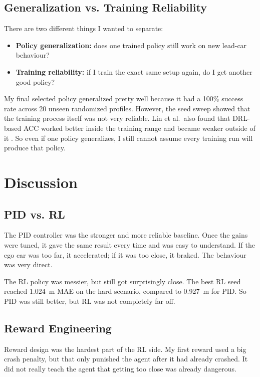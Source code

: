 \documentclass{article}
\begin{document}
\subsection*{Generalization vs. Training Reliability}

There are two different things I wanted to separate:

\begin{itemize}
    \item \textbf{Policy generalization:} does one trained policy still work on new lead-car behaviour?
    \item \textbf{Training reliability:} if I train the exact same setup again, do I get another good policy?
\end{itemize}

My final selected policy generalized pretty well because it had a 100\% success rate across 20 unseen randomized profiles. However, the seed sweep showed that the training process itself was not very reliable. Lin et al.\ also found that DRL-based ACC worked better inside the training range and became weaker outside of it \cite{lin2020comparison}. So even if one policy generalizes, I still cannot assume every training run will produce that policy.

\section{Discussion}

\subsection*{PID vs. RL}

The PID controller was the stronger and more reliable baseline. Once the gains were tuned, it gave the same result every time and was easy to understand. If the ego car was too far, it accelerated; if it was too close, it braked. The behaviour was very direct.

The RL policy was messier, but still got surprisingly close. The best RL seed reached \SI{1.024}{m} MAE on the hard scenario, compared to \SI{0.927}{m} for PID. So PID was still better, but RL was not completely far off.

\subsection*{Reward Engineering}

Reward design was the hardest part of the RL side. My first reward used a big crash penalty, but that only punished the agent after it had already crashed. It did not really teach the agent that getting too close was already dangerous.
\end{document}
